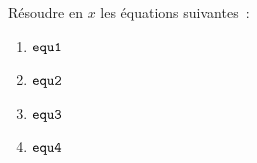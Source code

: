 \documentclass[exercice]{thedocument}%
\begin{document}
%
Résoudre en $x$ les équations suivantes~:
\begin{enumerate}
    \item $\<equ1;$
    \item $\<equ2;$
    \item $\<equ3;$
    \item $\<equ4;$
\end{enumerate}
\end{document}
